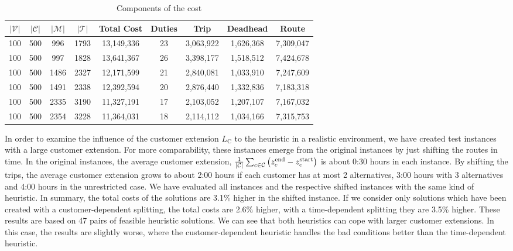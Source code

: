 \begin{table}[htb]
	\centering
	\begin{tabular}{ccccccccc}
		\toprule
		$\vert\mathcal{V}\vert$ & $\vert\mathcal{C}\vert$ & $\vert\mathcal{M}\vert$ & $\vert\mathcal{T}\vert$ & Total Cost & Duties & Trip & Deadhead & Route \\
		\midrule
		100 & 500 &  996 & 1793 & 13,149,336 & 23 & 3,063,922 & 1,626,368 & 7,309,047 \\
		100 & 500 &  997 & 1828 & 13,641,367 & 26 & 3,398,177 & 1,518,512 & 7,424,678 \\
		100 & 500 & 1486 & 2327 & 12,171,599 & 21 & 2,840,081 & 1,033,910 & 7,247,609 \\
		100 & 500 & 1491 & 2338 & 12,392,594 & 20 & 2,876,440 & 1,332,836 & 7,183,318 \\
		100 & 500 & 2335 & 3190 & 11,327,191 & 17 & 2,103,052 & 1,207,107 & 7,167,032 \\
		100 & 500 & 2354 & 3228 & 11,364,031 & 18 & 2,114,112 & 1,034,166 & 7,315,753 \\
		\bottomrule
	\end{tabular}
	\caption{Components of the cost}
	\label{tab:results:general}
\end{table}

In order to examine the influence of the customer extension $L_{\operatorname{C}}$ to the heuristic in a realistic environment, we have created test instances with a large customer extension. For more comparability, these instances emerge from the original instances by just shifting the routes in time. In the original instances, the average customer extension, \ie ${\frac{1}{\vert\mathcal{C}\vert}\sum_{c\in\mathcal{C}}\left(z^{\operatorname{end}}_c - z^{\operatorname{start}}_c\right)}$ is about 0:30 hours in each instance. By shifting the trips, the average customer extension grows to about 2:00 hours if each customer has at most 2 alternatives, 3:00 hours with 3 alternatives and 4:00 hours in the unrestricted case. We have evaluated all instances and the respective shifted instances with the same kind of heuristic. In summary, the total costs of the solutions are 3.1\% higher in the shifted instance. If we consider only solutions which have been created with a customer-dependent splitting, the total costs are 2.6\% higher, with a time-dependent splitting they are 3.5\% higher. These results are based on 47 pairs of feasible heuristic solutions. We can see that both heuristics can cope with larger customer extensions. In this case, the results are slightly worse, where the customer-dependent heuristic handles the bad conditions better than the time-dependent heuristic.

